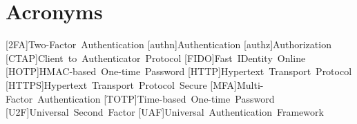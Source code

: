 \documentclass[twoside,twocolumn]{article}
\title{\mytitle} %
\author{%
  \textsc{Nils Siegle} \\[1ex] %
  \normalsize 3087271 \\ %
  \normalsize \href{mailto:nils.siegle@stud.uni-due.de}{nils.siegle@stud.uni-due.de} %
}
\date{\today} %
\begin{document}
\maketitle

\newpage
\onecolumn
\tableofcontents
\newpage


\section*{Acronyms}
\begin{acronym}[AAAAAA]
  [2FA]{Two-Factor Authentication}
  [authn]{Authentication}
  [authz]{Authorization}
  [CTAP]{Client to Authenticator Protocol}
  [FIDO]{Fast IDentity Online}
  [HOTP]{HMAC-based One-time Password}
  [HTTP]{Hypertext Transport Protocol}
  [HTTPS]{Hypertext Transport Protocol Secure}
  [MFA]{Multi-Factor Authentication}
  [TOTP]{Time-based One-time Password}
  [U2F]{Universal Second Factor}
  [UAF]{Universal Authentication Framework}
\end{acronym}


\newpage
\twocolumn














\onecolumn

\printbibliography[heading=bibintoc]




\end{document}
